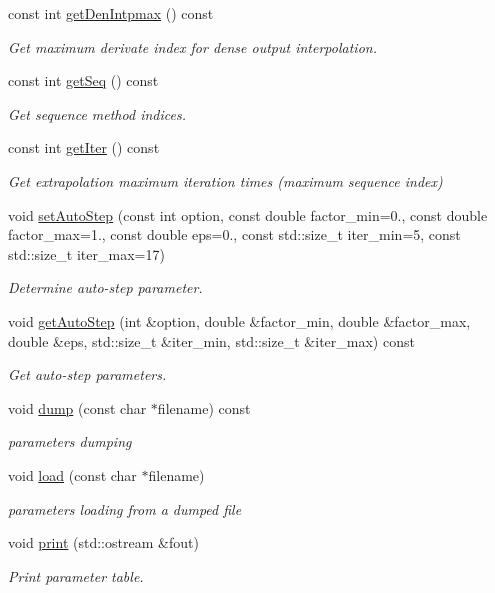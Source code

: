 \begin{DoxyCompactItemize}
const int \hyperlink{classARC_1_1chainpars_a31637df57e2c90f5435e58a08bdc1475}{get\+Den\+Intpmax} () const 
\begin{DoxyCompactList}\small\item\em Get maximum derivate index for dense output interpolation. \end{DoxyCompactList}\item 
const int \hyperlink{classARC_1_1chainpars_ae2a108596c0f621590192fbf5cd1727f}{get\+Seq} () const 
\begin{DoxyCompactList}\small\item\em Get sequence method indices. \end{DoxyCompactList}\item 
const int \hyperlink{classARC_1_1chainpars_a24ffafdeab7dfb59824a4dc3a17e5777}{get\+Iter} () const 
\begin{DoxyCompactList}\small\item\em Get extrapolation maximum iteration times (maximum sequence index) \end{DoxyCompactList}\item 
void \hyperlink{classARC_1_1chainpars_a12066ef8bca0ad69362d608959c9149b}{set\+Auto\+Step} (const int option, const double factor\+\_\+min=0., const double factor\+\_\+max=1., const double eps=0., const std\+::size\+\_\+t iter\+\_\+min=5, const std\+::size\+\_\+t iter\+\_\+max=17)
\begin{DoxyCompactList}\small\item\em Determine auto-\/step parameter. \end{DoxyCompactList}\item 
void \hyperlink{classARC_1_1chainpars_a2e5d65ea1a3b76263cad7fbd9e906e65}{get\+Auto\+Step} (int \&option, double \&factor\+\_\+min, double \&factor\+\_\+max, double \&eps, std\+::size\+\_\+t \&iter\+\_\+min, std\+::size\+\_\+t \&iter\+\_\+max) const 
\begin{DoxyCompactList}\small\item\em Get auto-\/step parameters. \end{DoxyCompactList}\item 
void \hyperlink{classARC_1_1chainpars_a96c5e40acaa2abb81e0630935eaf3ed3}{dump} (const char $\ast$filename) const 
\begin{DoxyCompactList}\small\item\em parameters dumping \end{DoxyCompactList}\item 
void \hyperlink{classARC_1_1chainpars_aa42cf56363fba1701a26cc445eda01d5}{load} (const char $\ast$filename)
\begin{DoxyCompactList}\small\item\em parameters loading from a dumped file \end{DoxyCompactList}\item 
void \hyperlink{classARC_1_1chainpars_a3bd667353d49614c52ad6c965a7480f3}{print} (std\+::ostream \&fout)
\begin{DoxyCompactList}\small\item\em Print parameter table. \end{DoxyCompactList}\end{DoxyCompactItemize}

